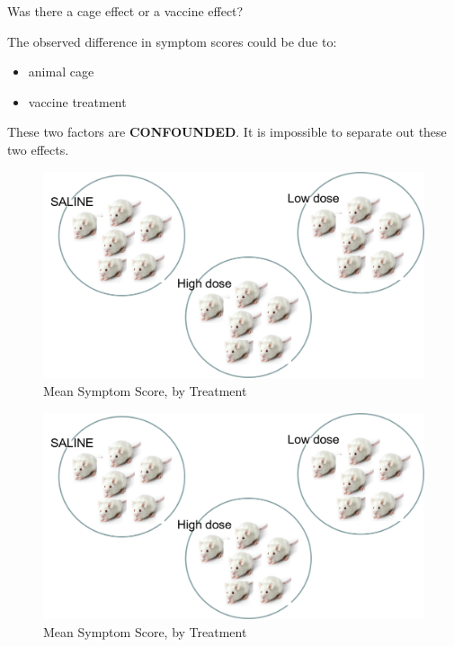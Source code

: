 \documentclass[
  12pt,
  ignorenonframetext,
  aspectratio=169,
]{beamer}
\providecommand{\tightlist}{%
  \setlength{\itemsep}{0pt}\setlength{\parskip}{0pt}}
\begin{document}
\begin{frame}{Was there a cage effect or a vaccine effect?}
\protect\hypertarget{was-there-a-cage-effect-or-a-vaccine-effect}{}

The observed difference in symptom scores could be due to:

\begin{itemize}
\tightlist
\item
  animal cage
\item
  vaccine treatment
\end{itemize}

These two factors are \textbf{CONFOUNDED}. It is impossible to separate
out these two effects.

\begin{figure}

\hfill{}\includegraphics[width=0.5\linewidth,height=0.5\textheight]{../images/Lecture1_cages} 

\caption{Mean Symptom Score, by Treatment}\label{fig:unnamed-chunk-3}
\end{figure}

\begin{figure}

{\centering \includegraphics[width=0.5\linewidth,height=0.5\textheight]{../images/Lecture1_cages} 

}

\caption{Mean Symptom Score, by Treatment}\label{fig:unnamed-chunk-4}
\end{figure}

\end{frame}
\end{document}
